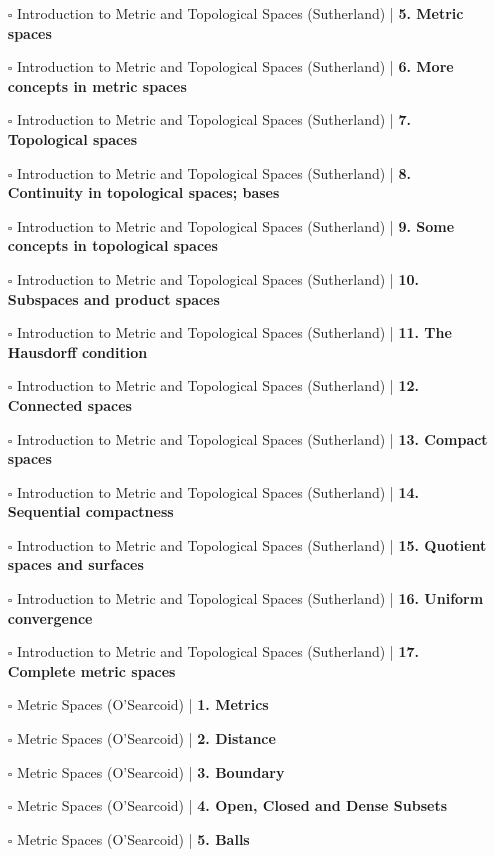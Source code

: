 \documentclass[a4, landscape, 12pt]{article}
\newcommand{\checkbox}{$\square$}%
\begin{document}
\begin{itemize}
{}
\item [\checkbox] Introduction to Metric and Topological Spaces (Sutherland)  | \textbf{5. Metric spaces
}
\item [\checkbox] Introduction to Metric and Topological Spaces (Sutherland)  | \textbf{6. More concepts in metric spaces
}
\item [\checkbox] Introduction to Metric and Topological Spaces (Sutherland)  | \textbf{7. Topological spaces
}
\item [\checkbox] Introduction to Metric and Topological Spaces (Sutherland)  | \textbf{8. Continuity in topological spaces; bases
}
\item [\checkbox] Introduction to Metric and Topological Spaces (Sutherland)  | \textbf{9. Some concepts in topological spaces
}
\item [\checkbox] Introduction to Metric and Topological Spaces (Sutherland)  | \textbf{10. Subspaces and product spaces
}
\item [\checkbox] Introduction to Metric and Topological Spaces (Sutherland)  | \textbf{11. The Hausdorff condition
}
\item [\checkbox] Introduction to Metric and Topological Spaces (Sutherland)  | \textbf{12. Connected spaces
}
\item [\checkbox] Introduction to Metric and Topological Spaces (Sutherland)  | \textbf{13. Compact spaces
}
\item [\checkbox] Introduction to Metric and Topological Spaces (Sutherland)  | \textbf{14. Sequential compactness
}
\item [\checkbox] Introduction to Metric and Topological Spaces (Sutherland)  | \textbf{15. Quotient spaces and surfaces
}
\item [\checkbox] Introduction to Metric and Topological Spaces (Sutherland)  | \textbf{16. Uniform convergence
}
\item [\checkbox] Introduction to Metric and Topological Spaces (Sutherland)  | \textbf{17. Complete metric spaces
}
\item [\checkbox] Metric Spaces (O'Searcoid)  | \textbf{1. Metrics
}
\item [\checkbox] Metric Spaces (O'Searcoid)  | \textbf{2. Distance
}
\item [\checkbox] Metric Spaces (O'Searcoid)  | \textbf{3. Boundary
}
\item [\checkbox] Metric Spaces (O'Searcoid)  | \textbf{4. Open, Closed and Dense Subsets
}
\item [\checkbox] Metric Spaces (O'Searcoid)  | \textbf{5. Balls
}
\end{itemize}
\end{document}

